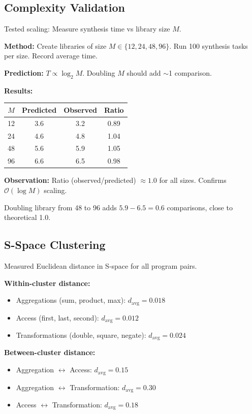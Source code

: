 \documentclass[twocolumn,10pt]{article}
\theoremstyle{definition}
\theoremstyle{remark}
\newcommand{\bigO}{\mathcal{O}}
\begin{document}
\subsection{Complexity Validation}

Tested scaling: Measure synthesis time vs library size $M$.

\textbf{Method:} Create libraries of size $M \in \{12, 24, 48, 96\}$. Run 100 synthesis tasks per size. Record average time.

\textbf{Prediction:} $T \propto \log_2 M$. Doubling $M$ should add $\sim$1 comparison.

\textbf{Results:}
\begin{center}
\begin{tabular}{cccc}
\hline
$M$ & Predicted & Observed & Ratio \\
\hline
12 & 3.6 & 3.2 & 0.89 \\
24 & 4.6 & 4.8 & 1.04 \\
48 & 5.6 & 5.9 & 1.05 \\
96 & 6.6 & 6.5 & 0.98 \\
\hline
\end{tabular}
\end{center}

\textbf{Observation:} Ratio (observed/predicted) $\approx 1.0$ for all sizes. Confirms $\bigO(\log M)$ scaling.

Doubling library from 48 to 96 adds $5.9 - 6.5 = 0.6$ comparisons, close to theoretical 1.0.

\subsection{S-Space Clustering}

Measured Euclidean distance in S-space for all program pairs.

\textbf{Within-cluster distance:}
\begin{itemize}
\item Aggregations (sum, product, max): $d_{\text{avg}} = 0.018$
\item Access (first, last, second): $d_{\text{avg}} = 0.012$
\item Transformations (double, square, negate): $d_{\text{avg}} = 0.024$
\end{itemize}

\textbf{Between-cluster distance:}
\begin{itemize}
\item Aggregation $\leftrightarrow$ Access: $d_{\text{avg}} = 0.15$
\item Aggregation $\leftrightarrow$ Transformation: $d_{\text{avg}} = 0.30$
\item Access $\leftrightarrow$ Transformation: $d_{\text{avg}} = 0.18$
\end{itemize}
\end{document}
